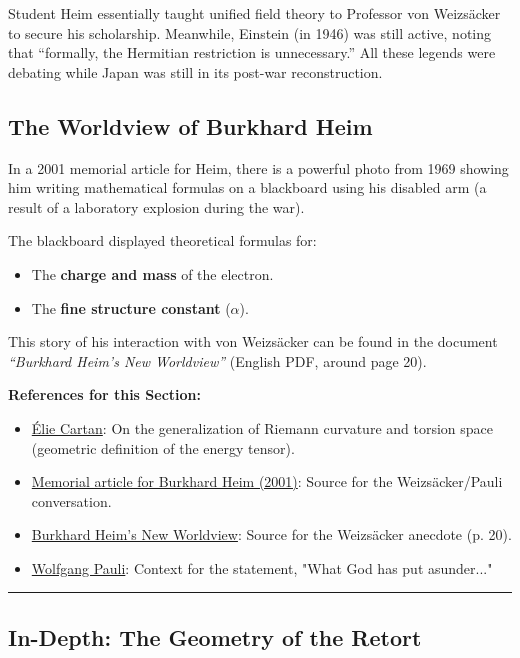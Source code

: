 \documentclass[11pt,a4paper,oneside]{article}
\newenvironment{sectionrefs}
  {\par\vspace{1em}\noindent\textbf{\textsf{References for this Section:}}\begin{itemize}[leftmargin=*, label={\scriptsize$\blacksquare$}, itemsep=2pt]}
  {\end{itemize}}
\newcommand{\hr}{\par\vspace{2em}\noindent\rule{\linewidth}{0.4pt}\par\vspace{2em}}
\begin{document}
Student Heim essentially taught unified field theory to Professor von Weizsäcker to secure his scholarship. Meanwhile, Einstein (in 1946) was still active, noting that ``formally, the Hermitian restriction is unnecessary.'' All these legends were debating while Japan was still in its post-war reconstruction.

\subsection{The Worldview of Burkhard Heim}

In a 2001 memorial article for Heim, there is a powerful photo from 1969 showing him writing mathematical formulas on a blackboard using his disabled arm (a result of a laboratory explosion during the war).

The blackboard displayed theoretical formulas for:
\begin{itemize}
    \item The \textbf{charge and mass} of the electron.
    \item The \textbf{fine structure constant} ($\alpha$).
\end{itemize}

This story of his interaction with von Weizsäcker can be found in the document \textit{``Burkhard Heim's New Worldview''} (English PDF, around page 20).

\begin{sectionrefs}
    \item \href{https://en.wikipedia.org/wiki/%C3%89lie_Cartan}{Élie Cartan}: On the generalization of Riemann curvature and torsion space (geometric definition of the energy tensor).
    \item \href{http://archiv.mufon-ces.org/text/deutsch/heim.htm}{Memorial article for Burkhard Heim (2001)}: Source for the Weizsäcker/Pauli conversation.
    \item \href{http://heim-theory.com/?page_id=161}{Burkhard Heim's New Worldview}: Source for the Weizsäcker anecdote (p. 20).
    \item \href{https://en.wikipedia.org/wiki/Wolfgang_Pauli}{Wolfgang Pauli}: Context for the statement, "What God has put asunder..."
\end{sectionrefs}

\hr

\subsection*{In-Depth: The Geometry of the Retort}
\end{document}
